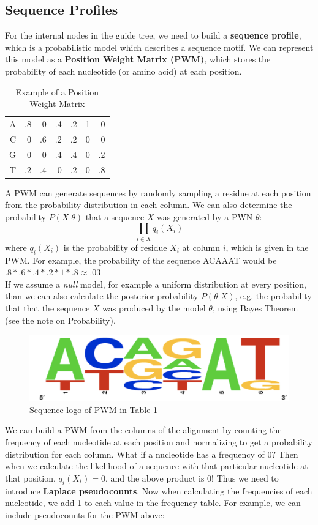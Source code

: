 \documentclass[12pt]{article}
\begin{document}
\subsection{Sequence Profiles}
For the internal nodes in the guide tree, we need to build a \textbf{sequence profile}, which is a probabilistic model which describes a sequence motif. We can represent this model as a \textbf{Position Weight Matrix (PWM)}, which stores the probability of each nucleotide (or amino acid) at each position.
\begin{table}[h]
\centering
\begin{tabular}{r|rrrrrr}
A & .8 & 0  & .4 & .2 & 1 & 0   \\ \cline{2-7} 
C & 0  & .6 & .2 & .2 & 0 & 0   \\ \cline{2-7} 
G & 0  & 0  & .4 & .4 & 0 & .2 \\ \cline{2-7} 
T & .2 & .4 & 0  & .2 & 0 & .8
\end{tabular}
\caption{Example of a Position Weight Matrix}
\label{tab:pwm}
\end{table}
A PWM can generate sequences by randomly sampling a residue at each position from the probability distribution in each column. We can also determine the probability $P(X | \theta)$ that a sequence $X$ was generated by a PWN $\theta$:
$$\prod_{i\in X} q_i(X_i)$$
where $q_i(X_i)$ is the probability of residue $X_i$ at column $i$, which is given in the PWM. For example, the probability of the sequence ACAAAT would be $.8 * .6 * .4 * .2 * 1 * .8 \approx .03$\\[10pt]
If we assume a \textit{null} model, for example a uniform distribution at every position, than we can also calculate the posterior probability $P(\theta | X)$, e.g. the probability that that the sequence $X$ was produced by the model $\theta$, using Bayes Theorem (see the note on Probability).\\[10pt]
\begin{figure}[t]
    \centering
    \includegraphics[width=.6\linewidth]{logo.png}
    \caption{Sequence logo of PWM in Table \ref{tab:pwm}}
    \label{fig:log}
\end{figure}
We can build a PWM from the columns of the alignment by counting the frequency of each nucleotide at each position and normalizing to get a probability distribution for each column. What if a nucleotide has a frequency of 0? Then when we calculate the likelihood of a sequence with that particular nucleotide at that position, $q_i(X_i) = 0$, and the above product is 0! Thus we need to introduce \textbf{Laplace pseudocounts}. Now when calculating the frequencies of each nucleotide, we add 1 to each value in the frequency table. For example, we can include pseudocounts for the PWM above:
\end{document}
